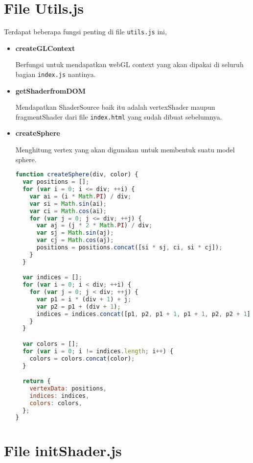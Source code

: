 \section{File Utils.js}

Terdapat beberapa fungsi penting di file \texttt{utils.js} ini,

\begin{itemize}
    \item \textbf{createGLContext}

          Berfungsi untuk mendapatkan webGL context yang akan dipakai di seluruh bagian \texttt{index.js} nantinya.

    \item \textbf{getShaderfromDOM}

          Mendapatkan ShaderSource baik itu adalah vertexShader maupun fragmentShader dari file \texttt{index.html} yang sudah dibuat sebelumnya.

    \item \textbf{createSphere}

          Menghitung vertex yang akan digunakan untuk membentuk suatu model sphere.


          \begin{lstlisting}[language=javascript, label={lst: createSphere}, caption={fungsi createSphere}]
function createSphere(div, color) {
  var positions = [];
  for (var i = 0; i <= div; ++i) {
    var ai = (i * Math.PI) / div;
    var si = Math.sin(ai);
    var ci = Math.cos(ai);
    for (var j = 0; j <= div; ++j) {
      var aj = (j * 2 * Math.PI) / div;
      var sj = Math.sin(aj);
      var cj = Math.cos(aj);
      positions = positions.concat([si * sj, ci, si * cj]);
    }
  }

  var indices = [];
  for (var i = 0; i < div; ++i) {
    for (var j = 0; j < div; ++j) {
      var p1 = i * (div + 1) + j;
      var p2 = p1 + (div + 1);
      indices = indices.concat([p1, p2, p1 + 1, p1 + 1, p2, p2 + 1]);
    }
  }

  var colors = [];
  for (var i = 0; i != indices.length; i++) {
    colors = colors.concat(color);
  }

  return {
    vertexData: positions,
    indices: indices,
    colors: colors,
  };
}

\end{lstlisting}

\end{itemize}

\section{File initShader.js}